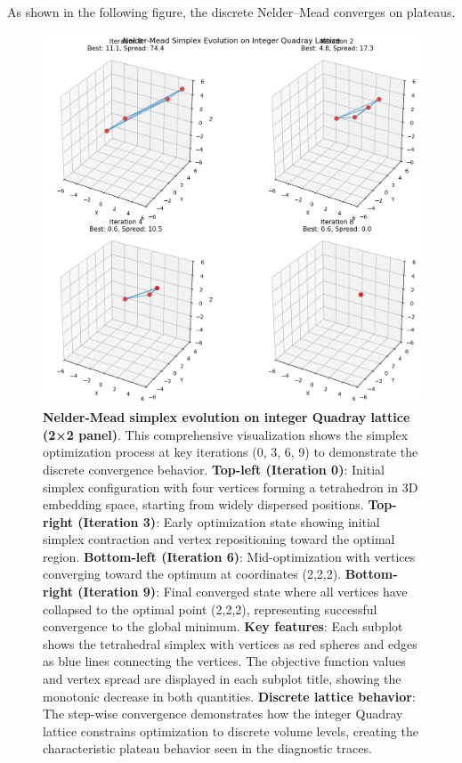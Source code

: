 \documentclass[
  10pt,
]{article}
\begin{document}
As shown in the following figure, the discrete Nelder--Mead converges on
plateaus.

\begin{figure}
\centering
\includegraphics{../output/figures/simplex_final.png}
\caption{\textbf{Nelder-Mead simplex evolution on integer Quadray
lattice (2×2 panel)}. This comprehensive visualization shows the simplex
optimization process at key iterations (0, 3, 6, 9) to demonstrate the
discrete convergence behavior. \textbf{Top-left (Iteration 0)}: Initial
simplex configuration with four vertices forming a tetrahedron in 3D
embedding space, starting from widely dispersed positions.
\textbf{Top-right (Iteration 3)}: Early optimization state showing
initial simplex contraction and vertex repositioning toward the optimal
region. \textbf{Bottom-left (Iteration 6)}: Mid-optimization with
vertices converging toward the optimum at coordinates (2,2,2).
\textbf{Bottom-right (Iteration 9)}: Final converged state where all
vertices have collapsed to the optimal point (2,2,2), representing
successful convergence to the global minimum. \textbf{Key features}:
Each subplot shows the tetrahedral simplex with vertices as red spheres
and edges as blue lines connecting the vertices. The objective function
values and vertex spread are displayed in each subplot title, showing
the monotonic decrease in both quantities. \textbf{Discrete lattice
behavior}: The step-wise convergence demonstrates how the integer
Quadray lattice constrains optimization to discrete volume levels,
creating the characteristic plateau behavior seen in the diagnostic
traces.}
\end{figure}
\end{document}
